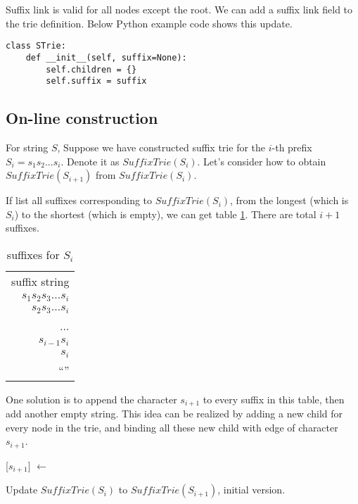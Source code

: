 \documentclass{article}
\begin{document}
Suffix link is valid for all nodes except the root. We can add a suffix link field to
the trie definition. Below Python example code shows this update.

\lstset{language=Python}
\begin{lstlisting}
class STrie:
    def __init__(self, suffix=None):
        self.children = {}
        self.suffix = suffix
\end{lstlisting}

\subsection{On-line construction}

For string $S$, Suppose we have constructed suffix trie for the $i$-th prefix
$S_i=s_1s_2...s_i$. Denote it as $SuffixTrie(S_i)$.
Let's consider how to obtain $SuffixTrie(S_{i+1})$ from $SuffixTrie(S_i)$.

If list all suffixes corresponding to $SuffixTrie(S_i)$, from the longest
(which is $S_i$) to the shortest (which is empty), we can get
table \ref{tab:suffixes_s_i}. There are total $i+1$ suffixes.

\begin{table}
  \begin{tabular}{r}
    suffix string \\
    $s_1s_2s_3...s_i$ \\
    $s_2s_3...s_i$ \\
    ... \\
    $s_{i-1}s_i$ \\
    $s_i$ \\
    ``'' \\
  \end{tabular}
  \caption{suffixes for $S_i$}
  \label{tab:suffixes_s_i}
\end{table}

One solution is to append the character $s_{i+1}$ to every suffix in this
table, then add another empty string. This idea can be realized by adding
a new child for every node in the trie, and binding all these new
child with edge of character $s_{i+1}$.

\begin{algorithm}
\begin{algorithmic}[1]
  \State {}[$s_{i+1}$] $\gets$ 
\EndFor
\end{algorithmic}
\caption{Update $SuffixTrie(S_i)$ to $SuffixTrie(S_{i+1})$, initial version.}
\label{algo:strie1}
\end{algorithm}
\end{document}
